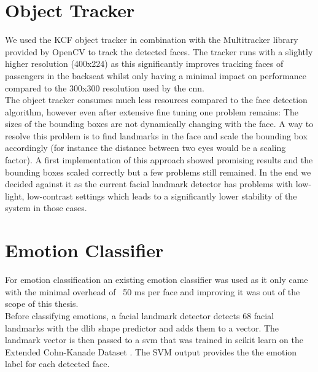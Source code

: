 \section{Object Tracker}
We used the KCF object tracker in combination with the Multitracker library provided by OpenCV to track the detected faces. The tracker runs with a slightly higher resolution (400x224) as this significantly improves tracking faces of passengers in the backseat whilst only having a minimal impact on performance compared to the 300x300 resolution used by the \gls{cnn}.\\
The object tracker consumes much less resources compared to the face detection algorithm, however even after extensive fine tuning one problem remains: The sizes of the bounding boxes are not dynamically changing with the face. A way to resolve this problem is to find landmarks in the face and scale the bounding box accordingly (for instance the distance between two eyes would be a scaling factor). A first implementation of this approach showed promising results and the bounding boxes scaled correctly but a few problems still remained. In the end we decided against it as the current facial landmark detector has problems with low-light, low-contrast settings which leads to a significantly lower stability of the system in those cases.
\section{Emotion Classifier}
For emotion classification an existing emotion classifier was used as it only came with the minimal overhead of ~50 ms per face and improving it was out of the scope of this thesis.\\
Before classifying emotions, a facial landmark detector detects 68 facial landmarks with the dlib shape predictor and adds them to a vector. The landmark vector is then passed to a \gls{svm} that was trained in scikit learn on the Extended Cohn-Kanade Dataset \cite{ckplus}. The SVM output provides the the emotion label for each detected face.